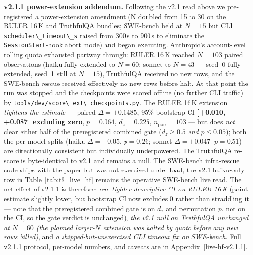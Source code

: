 \textbf{v2.1.1 power-extension addendum.} Following the v2.1 read above we pre-registered a power-extension amendment (N doubled from 15 to 30 on the RULER 16\,K and TruthfulQA bundles; SWE-bench held at $N=15$ but CLI \passthrough{\lstinline!scheduler\_timeout\_s!} raised from 300\,s to 900\,s to eliminate the \passthrough{\lstinline!SessionStart!}-hook abort mode) and began executing. Anthropic's account-level rolling quota exhausted partway through: RULER 16\,K reached $N=103$ paired observations (haiku fully extended to $N=60$; sonnet to $N=43$ --- seed~0 fully extended, seed~1 still at $N=15$), TruthfulQA received no new rows, and the SWE-bench rescue received effectively no new rows before halt. At that point the run was stopped and the checkpoints were scored offline (no further CLI traffic) by \passthrough{\lstinline!tools/dev/score\_ext\_checkpoints.py!}. The RULER 16\,K extension \emph{tightens the estimate} --- paired $\Delta=+0.0485$, 95\% bootstrap CI \textbf{[+0.010,\,+0.087] excluding zero}, $p=0.064$, $d_z=0.225$, $n_\text{pair}=103$ --- but does \emph{not} clear either half of the preregistered combined gate ($d_z \ge 0.5$ \emph{and} $p \le 0.05$); both the per-model splits (haiku $\Delta=+0.05$, $p=0.26$; sonnet $\Delta=+0.047$, $p=0.51$) are directionally consistent but individually underpowered. The TruthfulQA re-score is byte-identical to v2.1 and remains a null. The SWE-bench infra-rescue code ships with the paper but was not exercised under load; the v2.1 haiku-only row in Table~\ref{tab:t8_live_hf} remains the operative SWE-bench live read. The net effect of v2.1.1 is therefore: \emph{one tighter descriptive CI on RULER 16\,K} (point estimate slightly lower, but bootstrap CI now excludes 0 rather than straddling it --- note that the preregistered combined gate is on $d_z$ and permutation $p$, not on the CI, so the gate verdict is unchanged), \emph{the v2.1 null on TruthfulQA unchanged at $N=60$ (the planned larger-$N$ extension was halted by quota before any new rows billed)}, and \emph{a shipped-but-unexercised CLI timeout fix on SWE-bench}. Full v2.1.1 protocol, per-model numbers, and caveats are in Appendix~\ref{live-hf-v2.1.1}.

\begin{table}[!tbp]
\centering
\caption{\textbf{T8 --- Live Hugging Face rerun (\texttt{core4}).} Paired treatment vs.\ baseline at the pinned Hugging Face commit SHAs; see Appendix \ref{live-hf-rerun-v2.1} for pre-registration and per-bundle provenance.}
\label{tab:t8_live_hf}
{\small\setlength{\tabcolsep}{3pt}%
}
\end{table}

